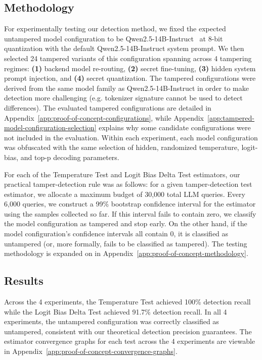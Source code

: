 \documentclass{article}
\begin{document}
\subsection{Methodology}
For experimentally testing our detection method, we fixed the expected untampered
model configuration to be Qwen2.5-14B-Instruct~\citep{qwen25_14b_instruct_hf}
at 8-bit quantization with the default Qwen2.5-14B-Instruct system prompt. We then selected
24 tampered variants of this configuration spanning across 4 tampering regimes: \textbf{(1)}
backend model re-routing, \textbf{(2)} secret fine-tuning, \textbf{(3)} hidden system prompt
injection, and \textbf{(4)} secret quantization. The tampered configurations were
derived from the same model family as Qwen2.5-14B-Instruct in order to make
detection more challenging (e.g. tokenizer signature cannot be used to detect
differences). The evaluated tampered configurations are detailed in
Appendix~\ref{app:proof-of-concept-configurations}, while
Appendix~\ref{app:tampered-model-configuration-selection} explains why some
candidate configurations were not included in the evaluation. Within each experiment, each model
configuration was obfuscated with the same selection of hidden, randomized temperature,
logit-bias, and top-p decoding parameters.

For each of the Temperature Test and Logit Bias Delta Test estimators, our
practical tamper-detection rule was as follows: for a given tamper-detection
test estimator, we allocate a maximum budget of 30,000 total LLM queries. Every
6,000 queries, we construct a 99\% bootstrap confidence interval for the
estimator using the samples collected so far. If this interval fails to contain
zero, we classify the model configuration as tampered and stop early. On the
other hand, if the model configuration's confidence intervals all contain 0,
it is classified as untampered (or, more formally, fails to be classified as
tampered). The testing methodology is expanded on in
Appendix~\ref{app:proof-of-concept-methodology}.

\subsection{Results}
Across the 4 experiments, the Temperature Test achieved 100\% detection recall while the Logit Bias Delta Test achieved 91.7\% detection recall. In all 4 experiments, the untampered configuration was correctly classified as untampered, consistent with our theoretical detection precision guarantees. The estimator convergence graphs for each test across the 4 experiments are viewable in Appendix~\ref{app:proof-of-concept-convergence-graphs}.
\end{document}
